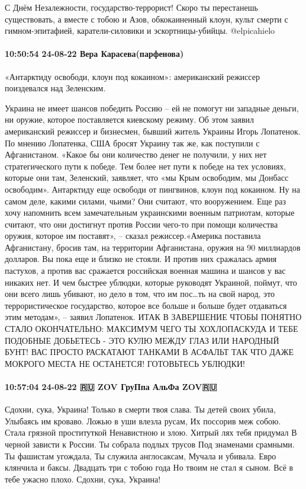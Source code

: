 С Днём Незалежности, государство-террорист!
Скоро ты перестанешь существовать, а вместе с тобою и Азов, обкокаиненный клоун, культ смерти с гимном-эпитафией, каратели-силовики и эскортницы-убийцы.
@elpicahielo


\paragraph{10:50:54 24-08-22 Вера Карасева(парфенова)}

«Антарктиду освободи, клоун под кокаином»: американский режиссер поиздевался над Зеленским.

Украина не имеет шансов победить Россию – ей не помогут ни западные деньги, ни
оружие, которое поставляется киевскому режиму. Об этом заявил американский
режиссер и бизнесмен, бывший житель Украины Игорь Лопатенок. По мнению
Лопатенка, США бросят Украину так же, как поступили с Афганистаном. «Какое бы
они количество денег не получили, у них нет стратегического пути к победе. Тем
более нет пути к победе на тех условиях, которые они там, Зеленский, заявляет,
что «мы Крым освободим, мы Донбасс освободим». Антарктиду еще освободи от
пингвинов, клоун под кокаином. Ну на самом деле, какими силами, чьими? Они
считают, что вооружением. Еще раз хочу напомнить всем замечательным украинскими
военным патриотам, которые считают, что они достигнут против России чего-то при
помощи количества оружия, которое им поставят», – сказал режиссер.«Америка
поставила Афганистану, бросив там, на территории Афганистана, оружия на 90
миллиардов долларов. Вы пока еще и близко не стояли. И против них сражалась
армия пастухов, а против вас сражается российская военная машина и шансов у вас
никаких нет. И чем быстрее ублюдки, которые руководят Украиной, поймут, что они
всего лишь убивают, но дело в том, что им пос…ть на свой народ, это
террористическое государство, которое все больше и больше будет отдаваться этим
методам», – заявил Лопатенок. ИТАК В ЗАВЕРШЕНИЕ ЧТОБЫ ПОНЯТНО СТАЛО
ОКОНЧАТЕЛЬНО: МАКСИМУМ ЧЕГО ТЫ ХОХЛОПАСКУДА И ТЕБЕ ПОДОБНЫЕ ДОБЬЕТЕСЬ - ЭТО
КУЛЮ МЕЖДУ ГЛАЗ ИЛИ НАРОДНЫЙ БУНТ! ВАС ПРОСТО РАСКАТАЮТ ТАНКАМИ В АСФАЛЬТ ТАК
ЧТО ДАЖЕ МОКРОГО МЕСТА НЕ ОСТАНЕТСЯ! ГОТОВЬТЕСЬ УБЛЮДКИ!

\paragraph{10:57:04 24-08-22 🇷🇺 ZOV ГруПпа АльФа ZOV🇷🇺}

Сдохни, сука, Украина!
Только в смерти твоя слава.
Ты детей своих убила,
Улыбаясь им кроваво.
Ложью в уши влезла русам,
Их поссорив меж собою.
Стала грязной проституткой
Ненавистною и злою.
Хитрый лях тебя придумал
В черной зависти к России.
Ты собрала подлых трусов
Под знаменами срамными.
Ты фашистам угождала,
Ты служила англосаксам,
Мучала и убивала.
Евро клянчила и баксы.
Двадцать три с тобою года
Но твоим не стал я сыном.
Всё в тебе ужасно плохо.
Сдохни, сука, Украина!

